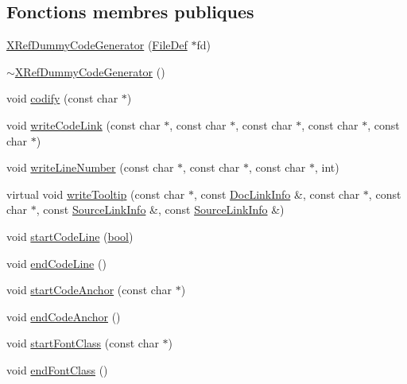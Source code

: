 \subsection*{Fonctions membres publiques}
\begin{DoxyCompactItemize}
\item 
\hyperlink{class_x_ref_dummy_code_generator_a323a1158e06e05a2676f7c17ebbc33cb}{X\+Ref\+Dummy\+Code\+Generator} (\hyperlink{class_file_def}{File\+Def} $\ast$fd)
\item 
\hyperlink{class_x_ref_dummy_code_generator_aadac9fe6433ae95315dacaaa0b844040}{$\sim$\+X\+Ref\+Dummy\+Code\+Generator} ()
\item 
void \hyperlink{class_x_ref_dummy_code_generator_a81331d5775ec9ff49ef03ebc8c0a0dae}{codify} (const char $\ast$)
\item 
void \hyperlink{class_x_ref_dummy_code_generator_a06d3c79e75348534d7fd21ef2ac17137}{write\+Code\+Link} (const char $\ast$, const char $\ast$, const char $\ast$, const char $\ast$, const char $\ast$)
\item 
void \hyperlink{class_x_ref_dummy_code_generator_a512157ca96e7b26f8b6827362a2a3ba0}{write\+Line\+Number} (const char $\ast$, const char $\ast$, const char $\ast$, int)
\item 
virtual void \hyperlink{class_x_ref_dummy_code_generator_ab174d5a290293c32246eb01ccb937645}{write\+Tooltip} (const char $\ast$, const \hyperlink{struct_doc_link_info}{Doc\+Link\+Info} \&, const char $\ast$, const char $\ast$, const \hyperlink{struct_source_link_info}{Source\+Link\+Info} \&, const \hyperlink{struct_source_link_info}{Source\+Link\+Info} \&)
\item 
void \hyperlink{class_x_ref_dummy_code_generator_af53c0624cbc5f7a42b8232a3c9255d23}{start\+Code\+Line} (\hyperlink{qglobal_8h_a1062901a7428fdd9c7f180f5e01ea056}{bool})
\item 
void \hyperlink{class_x_ref_dummy_code_generator_a6b4a0fd7e9d9b39e05bf65f7dcc1021e}{end\+Code\+Line} ()
\item 
void \hyperlink{class_x_ref_dummy_code_generator_a631b1d06fec1f66cc11e47aa395133dc}{start\+Code\+Anchor} (const char $\ast$)
\item 
void \hyperlink{class_x_ref_dummy_code_generator_a292b106bc657b26f830db130287afda1}{end\+Code\+Anchor} ()
\item 
void \hyperlink{class_x_ref_dummy_code_generator_a5c53cb36c03f583b7b236e482a0a6693}{start\+Font\+Class} (const char $\ast$)
\item 
void \hyperlink{class_x_ref_dummy_code_generator_a9a502e533ffc65e8db2b84e07a0d468a}{end\+Font\+Class} ()

\end{DoxyCompactItemize}
